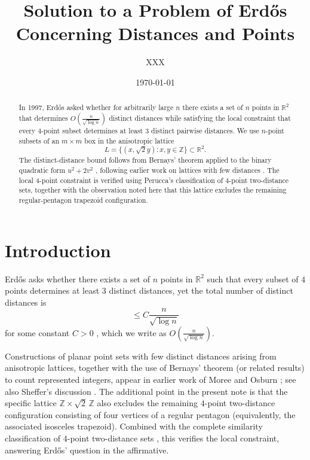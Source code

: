 \documentclass[11pt, reqno]{amsart}
\title[Solution to a Problem of Erd\H{o}s Concerning Distances and Points]{Solution to a Problem of Erd\H{o}s Concerning Distances and Points}
\author{XXX}
\date{\today}
\theoremstyle{definition}
\theoremstyle{remark}
\newcommand{\R}{\mathbb{R}}
\newcommand{\Z}{\mathbb{Z}}
\begin{document}
\begin{abstract}
In 1997, Erd\H{o}s asked \cite{erdos1997} whether for arbitrarily large $n$ there exists a set of $n$ points in $\R^2$ that determines $O(\frac{n}{\sqrt{\log n}})$ distinct distances while satisfying the local constraint that every $4$-point subset determines at least $3$ distinct pairwise distances. We use $n$-point subsets of an $m\times m$ box in the anisotropic lattice
\[
L = \{(x,\sqrt{2}y):x,y \in \Z\} \subset \R^2.
\]
The distinct-distance bound follows from Bernays' theorem applied to the binary quadratic form $u^2+2v^2$ \cite{brinkmoreeosburn2011}, following earlier work on lattices with few distances \cite{sheffer2014blog, moreeosburn2006}. The local $4$-point constraint is verified using Perucca's classification \cite{perucca4points} of $4$-point two-distance sets, together with the observation noted here that this lattice excludes the remaining regular-pentagon trapezoid configuration.
\end{abstract}

\maketitle

\section{Introduction}

Erd\H{o}s asks whether there exists a set of $n$ points in $\R^2$ such that every subset
of $4$ points determines at least $3$ distinct distances, yet the total number of distinct distances is
\[
\le C\frac{n}{\sqrt{\log n}}
\]
for some constant $C > 0$ \cite{erdos1997}, which we write as $O\!\left(\frac{n}{\sqrt{\log n}}\right)$.
 
 Constructions of planar point sets with few distinct distances arising from anisotropic lattices, together with the use of Bernays' theorem (or related results) to count represented integers, appear in earlier work of Moree and Osburn \cite{moreeosburn2006}; see also Sheffer's discussion \cite{sheffer2014blog}. The additional point in the present note is that the specific lattice $\Z\times \sqrt2\,\Z$ also excludes the remaining $4$-point two-distance configuration consisting of four vertices of a regular pentagon (equivalently, the associated isosceles trapezoid). Combined with the complete similarity classification of $4$-point two-distance sets \cite{perucca4points}, this verifies the local constraint, answering Erd\H{o}s’ question in the affirmative.
\end{document}
